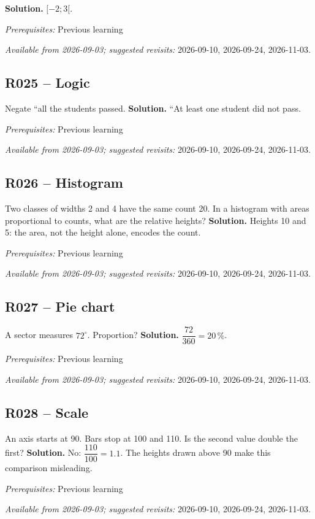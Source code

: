 \ifprof\textbf{Solution.} $[-2;3[$.\par\textit{Prerequisites:} Previous learning\par\textit{Available from 2026-09-03; suggested revisits:} 2026-09-10, 2026-09-24, 2026-11-03.\fi
{}\subsection*{R025 -- Logic}\label{R025}
Negate ``all the students passed.
\ifprof\textbf{Solution.} ``At least one student did not pass.\par\textit{Prerequisites:} Previous learning\par\textit{Available from 2026-09-03; suggested revisits:} 2026-09-10, 2026-09-24, 2026-11-03.\fi
{}\subsection*{R026 -- Histogram}\label{R026}
Two classes of widths 2 and 4 have the same count 20. In a histogram with areas proportional to counts, what are the relative heights?
\ifprof\textbf{Solution.} Heights 10 and 5: the area, not the height alone, encodes the count.\par\textit{Prerequisites:} Previous learning\par\textit{Available from 2026-09-03; suggested revisits:} 2026-09-10, 2026-09-24, 2026-11-03.\fi
{}\subsection*{R027 -- Pie chart}\label{R027}
A sector measures $72^\circ$. Proportion?
\ifprof\textbf{Solution.} $\dfrac{72}{360}=20\,\%$.\par\textit{Prerequisites:} Previous learning\par\textit{Available from 2026-09-03; suggested revisits:} 2026-09-10, 2026-09-24, 2026-11-03.\fi
{}\subsection*{R028 -- Scale}\label{R028}
An axis starts at 90. Bars stop at 100 and 110. Is the second value double the first?
\ifprof\textbf{Solution.} No: $\dfrac{110}{100}=1.1$. The heights drawn above 90 make this comparison misleading.\par\textit{Prerequisites:} Previous learning\par\textit{Available from 2026-09-03; suggested revisits:} 2026-09-10, 2026-09-24, 2026-11-03.\fi
